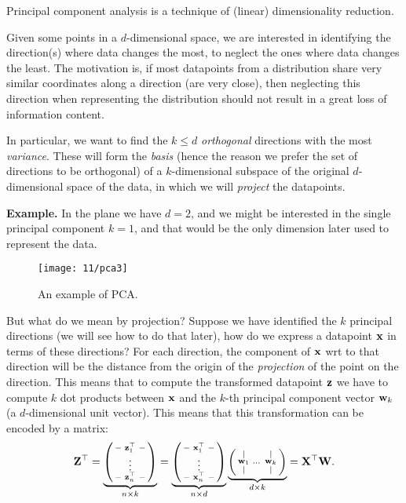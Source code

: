 
Principal component analysis is a technique of (linear) dimensionality reduction. 

Given some points in a $d$-dimensional space, we are interested in identifying the direction(s) where data changes the most, to neglect the ones where data changes the least. The motivation is, if most datapoints from a distribution share very similar coordinates along a direction (are very close), then neglecting this direction when representing the distribution should not result in a great loss of information content.

In particular, we want to find the $k \leq d$ \emph{orthogonal} directions with the most \emph{variance}. These will form the \emph{basis} (hence the reason we prefer the set of directions to be orthogonal) of a $k$-dimensional subspace of the original $d$-dimensional space of the data, in which we will \emph{project} the datapoints. 

\textbf{Example.} In the plane we have $d = 2$, and we might be interested in the single principal component $k = 1$, and that would be the only dimension later used to represent the data.
\begin{figure}[H]
	\centering
	\texttt{[image: 11/pca3]}
	\caption{An example of PCA.}\label{fig:pca-2d}	
\end{figure}

But what do we mean by projection? Suppose we have identified the $k$ principal directions (we will see how to do that later), how do we express a datapoint $\vb{x}$ in terms of these directions?
For each direction, the component of $\vb{x}$ wrt to that direction will be the distance from the origin of the \emph{projection} of the point on the direction. This means that to compute the transformed datapoint $\vb{z}$ we have to compute $k$ dot products between $\vb{x}$ and the $k$-th principal component vector $\vb{w}_k$ (a $d$-dimensional unit vector). This means that this transformation can be encoded by a matrix:
\begin{equation}
	\vb{Z}^{\top} = \underbrace{\left( \begin{smallmatrix}-&\mathbf{z}_1^\top&-  \\ & \vdots & \\ -&\mathbf{z}_n^\top &-\end{smallmatrix} \right)}_{n \times k} =  \underbrace{\left( \begin{smallmatrix}-&\mathbf{x}_1^\top&-  \\ & \vdots & \\ -&\mathbf{x}_n^\top &-\end{smallmatrix} \right)}_{n \times d} \underbrace{\left( \begin{smallmatrix} |& &|\\\mathbf{w}_1& \dots&\mathbf{w}_k \\ |& &| \end{smallmatrix} \right)}_{d \times k} = \vb{X}^{\top} \vb{W} .
\end{equation}



